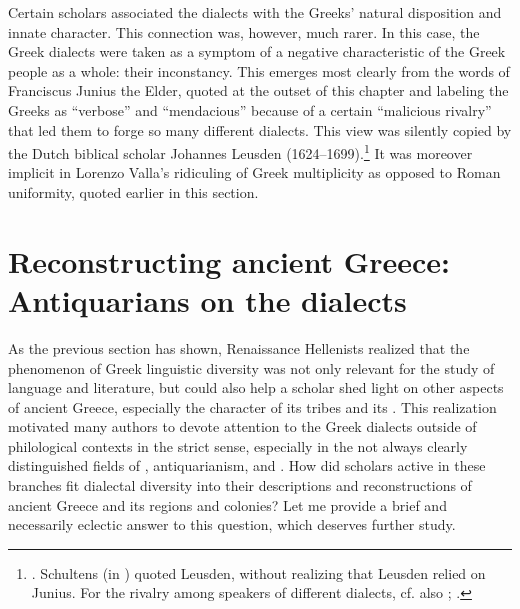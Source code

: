 Certain scholars associated the dialects with the Greeks’ natural disposition and innate character. This connection was, however, much rarer. In this case, the Greek dialects were taken as a symptom of a negative characteristic of the Greek people as a whole: their inconstancy. This emerges most clearly from the words of Franciscus Junius the Elder, quoted at the outset of this chapter and labeling the Greeks as “verbose” and “mendacious” because of a certain “malicious rivalry” that led them to forge so many different dialects. This view was silently copied by the Dutch biblical scholar Johannes Leusden (1624–1699).\footnote{\citet[a.4\textsc{\textsuperscript{r}}\textsc{–}a.4\textsc{\textsuperscript{v}}, 167]{Leusden1656}. Schultens (in \citet[§\textsc{xlix.}δ]{Eskhult_albert_nodate}) quoted Leusden, without realizing that Leusden relied on Junius. For the rivalry among speakers of different dialects, cf. also \citet[5\textsc{\textsuperscript{r}}]{Baile1588}; \citet[\textsc{b.3}\textsc{\textsuperscript{r}}]{Schorling1678}.} It was moreover implicit in Lorenzo Valla’s ridiculing of Greek multiplicity as opposed to Roman uniformity, quoted earlier in this section.

\section{Reconstructing ancient Greece: Antiquarians on the dialects}\label{sec:7.6}


As the previous section has shown, Renaissance Hellenists realized that the phenomenon of Greek linguistic diversity was not only relevant for the study of language and literature, but could also help a scholar shed light on other aspects of ancient Greece, especially the character of its tribes and its . This realization motivated many authors to devote attention to the Greek dialects outside of philological contexts in the strict sense, especially in the not always clearly distinguished fields of , antiquarianism, and . How did scholars active in these branches fit dialectal diversity into their descriptions and reconstructions of ancient Greece and its regions and colonies? Let me provide a brief and necessarily eclectic answer to this question, which deserves further study.

